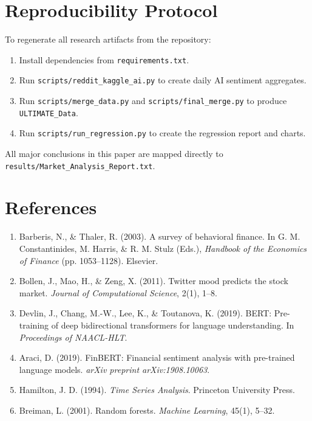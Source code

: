 \documentclass[12pt]{article}
\begin{document}
\section{Reproducibility Protocol}
To regenerate all research artifacts from the repository:
\begin{enumerate}
    \item Install dependencies from \texttt{requirements.txt}.
    \item Run \texttt{scripts/reddit\_kaggle\_ai.py} to create daily AI sentiment aggregates.
    \item Run \texttt{scripts/merge\_data.py} and \texttt{scripts/final\_merge.py} to produce \texttt{ULTIMATE\_Data}.
    \item Run \texttt{scripts/run\_regression.py} to create the regression report and charts.
\end{enumerate}
All major conclusions in this paper are mapped directly to \texttt{results/Market\_Analysis\_Report.txt}.

\clearpage
\FloatBarrier
\section*{References}
\begin{enumerate}
    \item Barberis, N., \& Thaler, R. (2003). A survey of behavioral finance. In G. M. Constantinides, M. Harris, \& R. M. Stulz (Eds.), \textit{Handbook of the Economics of Finance} (pp. 1053--1128). Elsevier.
    \item Bollen, J., Mao, H., \& Zeng, X. (2011). Twitter mood predicts the stock market. \textit{Journal of Computational Science}, 2(1), 1--8.
    \item Devlin, J., Chang, M.-W., Lee, K., \& Toutanova, K. (2019). BERT: Pre-training of deep bidirectional transformers for language understanding. In \textit{Proceedings of NAACL-HLT}.
    \item Araci, D. (2019). FinBERT: Financial sentiment analysis with pre-trained language models. \textit{arXiv preprint arXiv:1908.10063}.
    \item Hamilton, J. D. (1994). \textit{Time Series Analysis}. Princeton University Press.
    \item Breiman, L. (2001). Random forests. \textit{Machine Learning}, 45(1), 5--32.
\end{enumerate}
\end{document}
